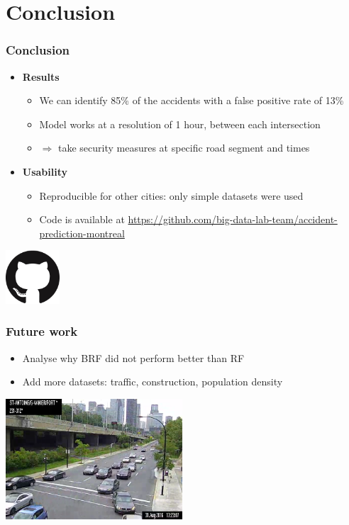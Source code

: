 \documentclass[slidestop,compress,red,mathserif]{beamer}
\begin{document}
\section{Conclusion}

\begin{frame}
  \frametitle{Conclusion}
  \begin{itemize}
    \item[] \textbf{Results}
    \begin{itemize} 
    \item We can identify 85\% of the accidents with a false positive rate of 13\%
    \item Model works at a resolution of 1 hour, between each intersection
    \item $\Rightarrow$ take security measures at specific road segment and times
    \end{itemize}
    \item[] \textbf{Usability}
    \begin{itemize} 
    \item Reproducible for other cities: only simple datasets were used
    \item Code is available at \url{https://github.com/big-data-lab-team/accident-prediction-montreal}
    \end{itemize}
  \end{itemize}
  \centering
  \includegraphics[height=2cm]{Figures/github.png}
\end{frame}

\begin{frame}
  \frametitle{Future work}
  \begin{itemize}
    \item Analyse why BRF did not perform better than RF
    \item Add more datasets: traffic, construction, population density
  \end{itemize}
  \centering
  \includegraphics[height=4.5cm]{Figures/traffic_camera.png}
\end{frame}
\end{document}

